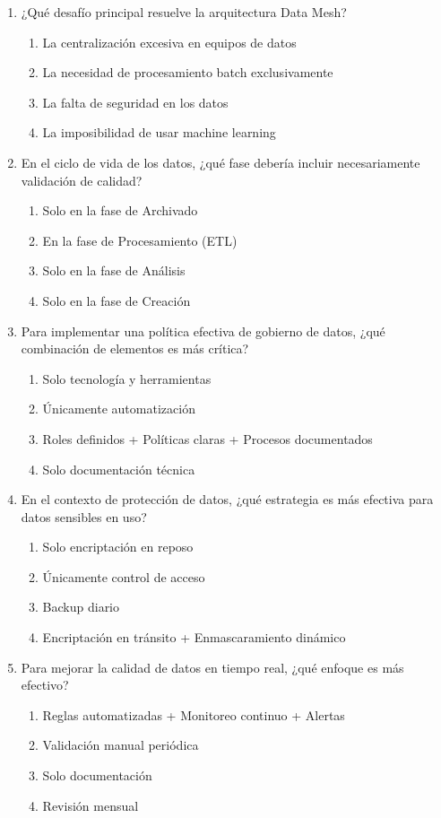 \documentclass[12pt]{article}
\begin{document}
\begin{enumerate}[label=\arabic*.]
\item ¿Qué desafío principal resuelve la arquitectura Data Mesh?
\begin{enumerate}
    \item La centralización excesiva en equipos de datos
    \item La necesidad de procesamiento batch exclusivamente
    \item La falta de seguridad en los datos
    \item La imposibilidad de usar machine learning
\end{enumerate}

\item En el ciclo de vida de los datos, ¿qué fase debería incluir necesariamente validación de calidad?
\begin{enumerate}
    \item Solo en la fase de Archivado
    \item En la fase de Procesamiento (ETL)
    \item Solo en la fase de Análisis
    \item Solo en la fase de Creación
\end{enumerate}

\item Para implementar una política efectiva de gobierno de datos, ¿qué combinación de elementos es más crítica?
\begin{enumerate}
    \item Solo tecnología y herramientas
    \item Únicamente automatización
    \item Roles definidos + Políticas claras + Procesos documentados
    \item Solo documentación técnica
\end{enumerate}

\item En el contexto de protección de datos, ¿qué estrategia es más efectiva para datos sensibles en uso?
\begin{enumerate}
    \item Solo encriptación en reposo
    \item Únicamente control de acceso
    \item Backup diario
    \item Encriptación en tránsito + Enmascaramiento dinámico
\end{enumerate}

\item Para mejorar la calidad de datos en tiempo real, ¿qué enfoque es más efectivo?
\begin{enumerate}
    \item Reglas automatizadas + Monitoreo continuo + Alertas
    \item Validación manual periódica
    \item Solo documentación
    \item Revisión mensual
\end{enumerate}


\end{enumerate}
\end{document}
